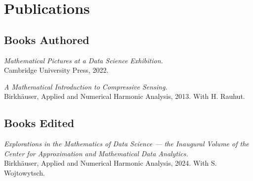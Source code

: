 \documentclass[11pt]{article}
\begin{document}
%


\section{Publications}

\subsection{Books Authored}
\betaremune
\item{\sl Mathematical Pictures at a Data Science Exhibition.}\\
Cambridge University Press, 2022. 
\item {\sl A Mathematical Introduction to Compressive Sensing.}\\
Birkh\"auser, Applied and Numerical Harmonic Analysis, 2013.  With H. Rauhut.
\eetaremune

\subsection{Books Edited}
\betaremune
\item{\sl Explorations in the Mathematics of Data Science --- the Inaugural Volume of the Center for Approximation and Mathematical Data Analytics.}\\
Birkh\"auser, Applied and Numerical Harmonic Analysis, 2024. 
With S. Wojtowytsch.
\eetaremune
\end{document}
